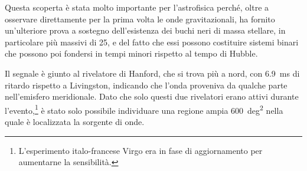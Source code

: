 Questa scoperta è stata molto importante per l'astrofisica perché, oltre a
osservare direttamente per la prima volta le onde gravitazionali, ha fornito
un'ulteriore prova a sostegno dell'esistenza dei buchi neri di massa stellare,
in particolare più massivi di \SI{25}{\solarmass}, e del fatto che essi possono
costituire sistemi binari che possono poi fondersi in tempi minori rispetto al
tempo di Hubble.

Il segnale è giunto al rivelatore di Hanford, che si trova più a nord, con
\SI{6.9}{\milli\second} di ritardo rispetto a Livingston, indicando che l'onda
proveniva da qualche parte nell'emisfero meridionale.  Dato che solo questi due
rivelatori erano attivi durante l'evento,\footnote{L'esperimento italo-francese
  Virgo era in fase di aggiornamento per aumentarne la sensibilità.} è stato
solo possibile individuare una regione ampia \SI{600}{deg\squared} nella quale è
localizzata la sorgente di onde.

